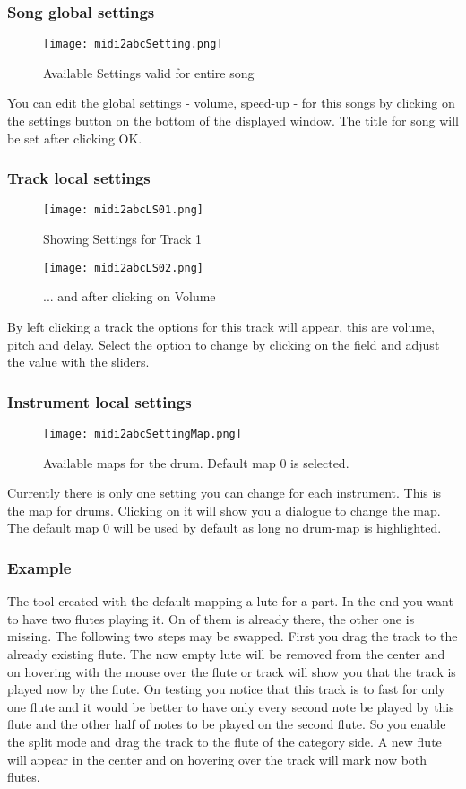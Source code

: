 \documentclass[10pt,a4paper,oneside]{article}
\begin{document}
\subsubsection{Song global settings}
\begin{figure}[hbtp]
\centering
\texttt{[image: midi2abcSetting.png]}
\caption{Available Settings valid for entire song}
\end{figure}
You can edit the global settings - volume, speed-up - for this songs by clicking on the settings button on the bottom of the displayed window. The title for song will be set after clicking OK.

\subsubsection{Track local settings}
\begin{figure}[hbtp]
\centering
\texttt{[image: midi2abcLS01.png]}
\caption{Showing Settings for Track 1}
\texttt{[image: midi2abcLS02.png]}
\caption{... and after clicking on Volume}
\end{figure}
By left clicking a track the options for this track will appear, this are volume, pitch and delay. Select the option to change by clicking on the field and adjust the value with the sliders.


\subsubsection{Instrument local settings}
\begin{figure}[hbtp]
\centering
\texttt{[image: midi2abcSettingMap.png]}
\caption{Available maps for the drum. Default map 0 is selected.}
\end{figure}
Currently there is only one setting you can change for each instrument. This is the map for drums. Clicking on it will show you a dialogue to change the map. The default map 0 will be used by default as long no drum-map is highlighted.

\subsubsection{Example} The tool created with the default mapping a lute for a part. In the end you want to have two flutes playing it. On of them is already there, the other one is missing. The following two steps may be swapped. First you drag the track to the already existing flute. The now empty lute will be removed from the center and on hovering with the mouse over the flute or track will show you that the track is played now by the flute. On testing you notice that this track is to fast for only one flute and it would be better to have only every second note be played by this flute and the other half of notes to be played on the second flute. So you enable the split mode and drag the track to the flute of the category side. A new flute will appear in the center and on hovering over the track will mark now both flutes.
\end{document}
